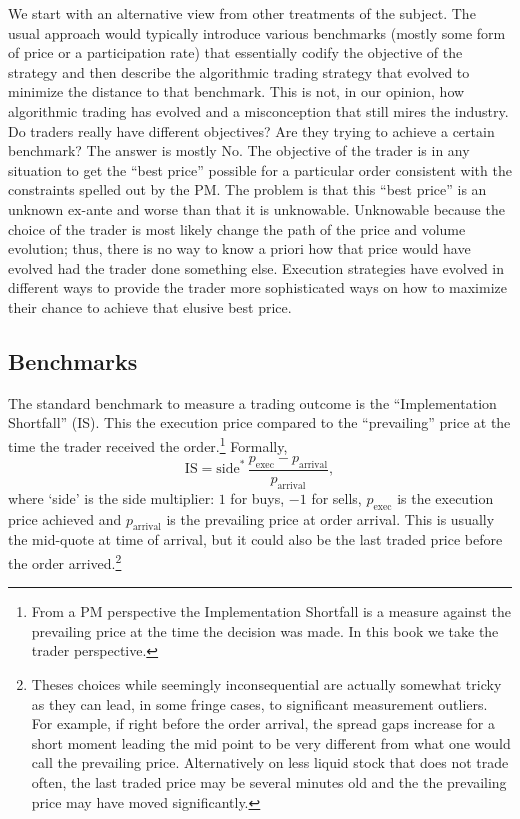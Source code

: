 We start with an alternative view from other treatments of the subject. The usual approach would typically introduce various benchmarks (mostly some form of price or a participation rate) that essentially codify the objective of the strategy and then describe the algorithmic trading strategy that evolved to minimize the distance to that benchmark. This is not, in our opinion, how algorithmic trading has evolved and a misconception that still mires the industry. Do traders really have different objectives? Are they trying to achieve a certain benchmark? The answer is mostly No. The objective of the trader is in any situation to get the ``best price'' possible for a particular order consistent with the constraints spelled out by the PM. The problem is that this ``best price''  is an unknown ex-ante and worse than that it is unknowable. Unknowable because the choice of the trader is most likely change the path of the price and volume evolution; thus, there is no way to know a priori how that price would have evolved had the trader done something else. Execution strategies have evolved in different ways to provide the trader more sophisticated ways on how to maximize their chance to achieve that elusive best price.



\subsection{Benchmarks \label{s:benchmarks}}

The standard benchmark to measure a trading outcome is the ``Implementation Shortfall'' (IS). This the execution price compared to the ``prevailing'' price at the time the trader received the order.\footnote{From a PM perspective the Implementation Shortfall is a measure against the prevailing price at the time the decision was made. In this book we take the trader perspective.} Formally,
        \begin{equation}
        \text{IS} = \text{side}^*\, \frac{p_{\text{exec}} - p_{\text{arrival}}}{p_{\text{arrival}}},
        \end{equation}
where `side' is the side multiplier: $1$ for buys, $-1$ for sells, $p_{\text{exec}}$ is the execution price achieved and $p_{\text{arrival}}$ is the prevailing price at order arrival. This is usually the mid-quote at time of arrival, but it could also be the last traded price before the order arrived.\footnote{Theses choices while seemingly inconsequential are actually somewhat tricky as they can lead, in some fringe cases, to significant measurement outliers. For example, if right before the order arrival, the spread gaps increase for a short moment leading the mid point to be very different from what one would call the prevailing price. Alternatively on less liquid stock that does not trade often, the last traded price may be several minutes old and the the prevailing price may have moved significantly.}


